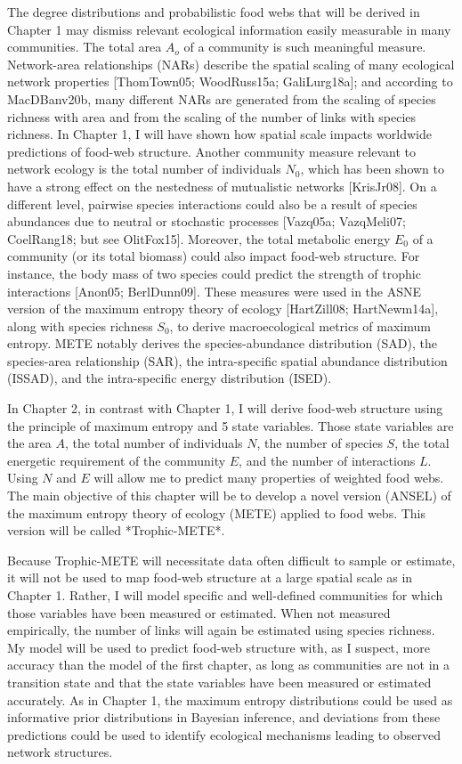 The degree distributions and probabilistic food webs that will be derived in
Chapter 1 may dismiss relevant ecological information easily measurable in many
communities. The total area $A_o$ of a community is such meaningful measure.
Network-area relationships (NARs) describe the spatial scaling of many
ecological network properties [ThomTown05; WoodRuss15a; GaliLurg18a]; and
according to MacDBanv20b, many different NARs are generated from the scaling of
species richness with area and from the scaling of the number of links with
species richness. In Chapter 1, I will have shown how spatial scale impacts
worldwide predictions of food-web structure. Another community measure relevant
to network ecology is the total number of individuals $N_0$, which has been
shown to have a strong effect on the nestedness of mutualistic networks
[KrisJr08]. On a different level, pairwise species interactions could also be a
result of species abundances due to neutral or stochastic processes [Vazq05a;
VazqMeli07; CoelRang18; but see OlitFox15]. Moreover, the total metabolic
energy $E_0$ of a community (or its total biomass) could also impact food-web
structure. For instance, the body mass of two species could predict the strength
of trophic interactions [Anon05; BerlDunn09]. These measures were used in the
ASNE version of the maximum entropy theory of ecology [HartZill08;
HartNewm14a], along with species richness $S_0$, to derive macroecological
metrics of maximum entropy. METE notably derives the species-abundance
distribution (SAD), the species-area relationship (SAR), the intra-specific
spatial abundance distribution (ISSAD), and the intra-specific energy
distribution (ISED). 

In Chapter 2, in contrast with Chapter 1, I will derive food-web structure using
the principle of maximum entropy and 5 state variables. Those state variables
are the area $A$, the total number of individuals $N$, the number of species
$S$, the total energetic requirement of the community $E$, and the number of
interactions $L$. Using $N$ and $E$ will allow me to predict many properties of
weighted food webs. The main objective of this chapter will be to develop a
novel version (ANSEL) of the maximum entropy theory of ecology (METE) applied to
food webs. This version will be called *Trophic-METE*.

Because Trophic-METE will necessitate data often difficult to sample or
estimate, it will not be used to map food-web structure at a large spatial scale
as in Chapter 1. Rather, I will model specific and well-defined communities for
which those variables have been measured or estimated. When not measured
empirically, the number of links will again be estimated using species richness.
My model will be used to predict food-web structure with, as I suspect, more
accuracy than the model of the first chapter, as long as communities are not in
a transition state and that the state variables have been measured or estimated
accurately. As in Chapter 1, the maximum entropy distributions could be used as
informative prior distributions in Bayesian inference, and deviations from these
predictions could be used to identify ecological mechanisms leading to observed
network structures.

